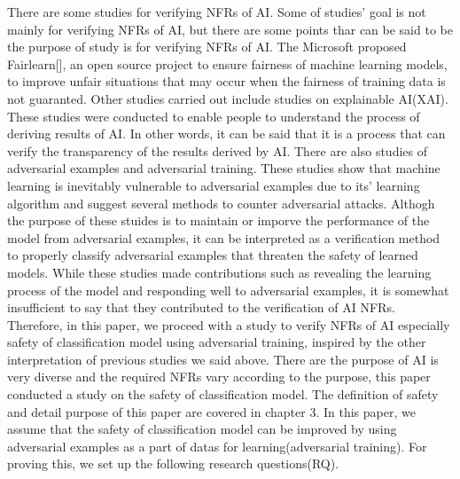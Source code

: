 \documentclass[journal,article,submit,moreauthors,pdftex]{Definitions/mdpi}
\begin{document}
There are some studies for verifying NFRs of AI. Some of studies' goal is not mainly for verifying NFRs of AI, but there are some points thar can be said to be the purpose of study is for verifying NFRs of AI.
The Microsoft proposed Fairlearn[], an open source project to ensure fairness of machine learning models, to improve unfair situations that may occur when the fairness of training data is not guaranted.
Other studies carried out include studies on explainable AI(XAI). These studies were conducted to enable people to understand the process of deriving results of AI. In other words, it can be said that it is a process that can verify the transparency of the results derived by AI.
There are also studies of adversarial examples and adversarial training. These studies show that machine learning is inevitably vulnerable to adversarial examples due to its' learning algorithm and suggest several methods to counter adversarial attacks.
Althogh the purpose of these stuides is to maintain or imporve the performance of the model from adversarial examples, it can be interpreted as a verification method to properly classify adversarial examples that threaten the safety of learned models.
While these studies made contributions such as revealing the learning process of the model and responding well to adversarial examples, it is somewhat insufficient to say that they contributed to the verification of AI NFRs.
Therefore, in this paper, we proceed with a study to verify NFRs of AI especially safety of classification model using adversarial training, inspired by the other interpretation of previous studies we said above.
There are the purpose of AI is very diverse and the required NFRs vary according to the purpose, this paper conducted a study on the safety of classification model. The definition of safety and detail purpose of this paper are covered in chapter 3.
In this paper, we assume that the safety of classification model can be improved by using adversarial examples as a part of datas for learning(adversarial training).
For proving this, we set up the following research questions(RQ).
\end{document}
